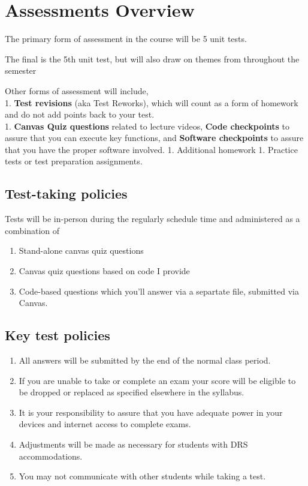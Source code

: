 \documentclass[
]{book}
\providecommand{\tightlist}{%
  \setlength{\itemsep}{0pt}\setlength{\parskip}{0pt}}
\begin{document}
\hypertarget{assessments}{%
\chapter{Assessments Overview}\label{assessments}}

The primary form of assessment in the course will be 5 unit tests.

The final is the 5th unit test, but will also draw on themes from throughout the semester

Other forms of assessment will include,\\
1. \textbf{Test revisions} (aka Test Reworks), which will count as a form of homework and do not add points back to your test.\\
1. \textbf{Canvas Quiz questions} related to lecture videos, \textbf{Code checkpoints} to assure that you can execute key functions, and \textbf{Software checkpoints} to assure that you have the proper software involved.
1. Additional homework
1. Practice tests or test preparation assignments.

\hypertarget{test-taking-policies}{%
\section{Test-taking policies}\label{test-taking-policies}}

Tests will be in-person during the regularly schedule time and administered as a combination of

\begin{enumerate}
\def\labelenumi{\arabic{enumi}.}
\tightlist
\item
  Stand-alone canvas quiz questions
\item
  Canvas quiz questions based on code I provide
\item
  Code-based questions which you'll answer via a separtate file, submitted via Canvas.
\end{enumerate}

\hypertarget{key-test-policies}{%
\section{Key test policies}\label{key-test-policies}}

\begin{enumerate}
\def\labelenumi{\arabic{enumi}.}
\tightlist
\item
  All answers will be submitted by the end of the normal class period.\\
\item
  If you are unable to take or complete an exam your score will be eligible to be dropped or replaced as specified elsewhere in the syllabus.
\item
  It is your responsibility to assure that you have adequate power in your devices and internet access to complete exams.\\
\item
  Adjustments will be made as necessary for students with DRS accommodations.
\item
  You may not communicate with other students while taking a test.
\end{enumerate}
\end{document}
